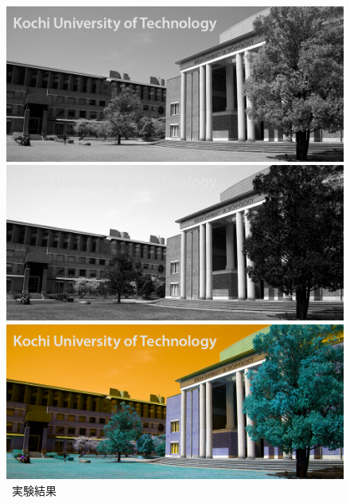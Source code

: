 \begin{figure}[H]
\begin{minipage}[b]{.19\textwidth}
        \includegraphics[keepaspectratio,width=\textwidth]{../../Figures/05_12_g.png}
    \end{minipage}
    \begin{minipage}[b]{.19\textwidth}
        \centering
        \includegraphics[keepaspectratio,width=\textwidth]{../../Figures/05_13_b.png}
    \end{minipage}
    \begin{minipage}[b]{.19\textwidth}
        \centering
        \includegraphics[keepaspectratio,width=\textwidth]{../../Figures/05_14_change.png}
    \end{minipage}
    \caption{\kadaiaa\ 実験結果}
    \begin{minipage}[b]{.23\textwidth}

\end{minipage}
\end{figure}
